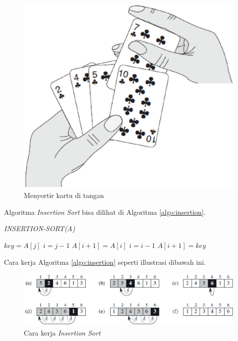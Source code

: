\begin{figure}%
\includegraphics[scale=0.5]{fig/insertionSort.eps}%
\caption{Menyortir kartu di tangan}%
\label{fig:InsertionSort}%
\end{figure}


Algoritma \textit{Insertion Sort} bisa dilihat di Algoritma \ref{algo:insertion}. 
\begin{algorithm}[H]
	\caption{\textit{INSERTION-SORT(A)}}
	\label{algo:insertion}
	\begin{algorithmic}[1]
		\STATE $key = A[j]$
		\STATE $i = j - 1$
			\STATE $A[i+1] = A[i]$
			\STATE $i = i - 1$
		\ENDWHILE
		\STATE $A[i+1] = key$
	\ENDFOR
	\end{algorithmic}
\end{algorithm} 

\FloatBarrier
Cara kerja Algoritma \ref{algo:insertion} seperti illustrasi dibawah ini.
\begin{figure}[htbp]%
\includegraphics[scale=0.8]{fig/InsertionSortMethod}%
\caption{Cara kerja \textit{Insertion Sort}}%
\label{fig:caraKerjaInsertion}%
\end{figure}
\FloatBarrier

